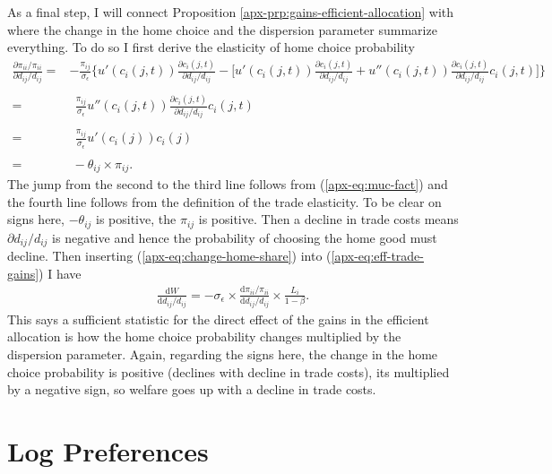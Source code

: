 \documentclass[12pt,pdftex]{article}
\begin{document}
\begin{onehalfspacing}
As a final step, I will connect Proposition \ref{apx-prp:gains-efficient-allocation} with \citet{arkolakis2012new} where the change in the home choice and the dispersion parameter summarize everything. To do so I first derive the elasticity of home choice probability
\begin{align}
\frac{\partial \pi_{ii} / \pi_{ii}}{\partial d_{ij} / d_{ij}} =& -\frac{\pi_{ij}}{\sigma_{\epsilon}} \bigg \{ u'(c_{i}(j,t))\frac{\partial c_{i}(j,t)}{\partial d_{ij} / d_{ij}} - \bigg [u'(c_{i}(j,t))\frac{\partial c_{i}(j,t)}{\partial d_{ij} / d_{ij}} + u''(c_{i}(j,t))\frac{\partial c_{i}(j,t)}{\partial d_{ij} / d_{ij}}c_{i}(j,t) \bigg ] \bigg \} \\
\nonumber \\
=& \ \ \frac{\pi_{ij}}{\sigma_{\epsilon}}u''(c_{i}(j,t))\frac{\partial c_{i}(j,t)}{\partial d_{ij} / d_{ij}}c_{i}(j,t) \\
\nonumber \\
=& \ \ \frac{\pi_{ij}}{\sigma_{\epsilon}} u'(c_{i}(j)) c_{i}(j) \\
\nonumber \\
=& \ - \theta_{ij} \times \pi_{ij}. \label{apx-eq:change-home-share}
\end{align}
The jump from the second to the third line follows from (\ref{apx-eq:muc-fact}) and the fourth line follows from the definition of the trade elasticity. To be clear on signs here, $-\theta_{ij}$ is positive, the $\pi_{ij}$ is positive. Then a decline in trade costs means $\partial d_{ij} / d_{ij}$ is negative and hence the probability of choosing the home good must decline.  Then inserting (\ref{apx-eq:change-home-share}) into  (\ref{apx-eq:eff-trade-gains}) I have
\begin{align}
\frac{\mathrm{d} W}{\mathrm{d} d_{ij} / d_{ij}} =  -\sigma_{\epsilon} \times \frac{\mathrm{d} \pi_{ii} / \pi_{ii}}{\mathrm{d} d_{ij} / d_{ij}} \times \frac{L_i}{1 - \beta}.
\label{apx-eq:eff-trade-gains-acr}
\end{align}
This says a sufficient statistic for the direct effect of the gains in the efficient allocation is how the home choice probability changes multiplied by the dispersion parameter. Again, regarding the signs here, the change in the home choice probability is positive (declines with decline in trade costs), its multiplied by a negative sign, so welfare goes up with a decline in trade costs. 

\section{Log Preferences}\label{apx-sec:log-preferences}


\end{onehalfspacing}
\end{document}
